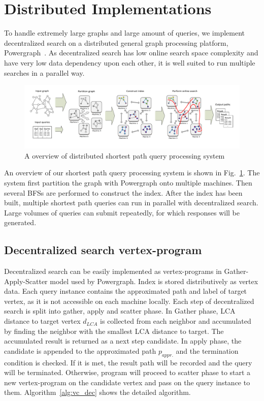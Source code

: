 \section{Distributed Implementations}
\label{implementation}

To handle extremely large graphs and large amount of queries, we implement decentralized search on a distributed general graph processing platform, Powergraph~\cite{180251}. As decentralized search has low online search space complexity and have very low data dependency upon each other, it is well suited to run multiple searches in a parallel way. 

\begin{figure}[ht]
    \centering
    \includegraphics[width=\linewidth]{./figures/new_illustrate/system.pdf}
    \caption{A overview of distributed shortest path query processing system}
    \label{fig:system}
\end{figure}

An overview of our shortest path query processing system is shown in Fig.~\ref{fig:system}. The system first partition the graph with Powergraph onto multiple machines. Then several BFSs are performed to construct the index. After the index has been built, multiple shortest path queries can run in parallel with decentralized search. Large volumes of queries can submit repeatedly, for which responses will be generated.

\subsection{Decentralized search vertex-program}

Decentralized search can be easily implemented as vertex-programs in Gather-Apply-Scatter model used by Powergraph. Index is stored distributively as vertex data. Each query instance contains the approximated path and label of target vertex, as it is not accessible on each machine locally. Each step of decentralized search is split into gather, apply and scatter phase. In Gather phase, LCA distance to target vertex $d_{LCA}$ is collected from each neighbor and accumulated by finding the neighbor with the smallest LCA distance to target. The accumulated result is returned as a next step candidate. In apply phase, the candidate is appended to the approximated path $p_{appr.}$ and the termination condition is checked. If it is met, the result path will be recorded and the query will be terminated. Otherwise, program will proceed to scatter phase to start a new vertex-program on the candidate vertex and pass on the query instance to them. Algorithm~\ref{alg:vc_dec} shows the detailed algorithm.

